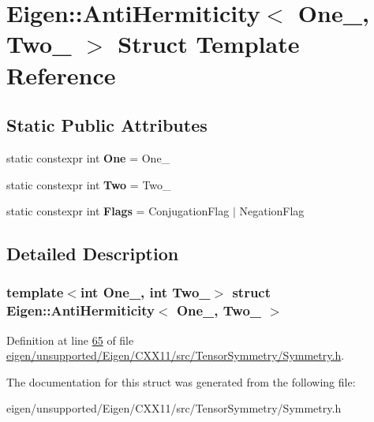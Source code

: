 \hypertarget{struct_eigen_1_1_anti_hermiticity}{}\section{Eigen\+:\+:Anti\+Hermiticity$<$ One\+\_\+, Two\+\_\+ $>$ Struct Template Reference}
\label{struct_eigen_1_1_anti_hermiticity}
\subsection*{Static Public Attributes}
\begin{DoxyCompactItemize}
\item 
\mbox{\label{struct_eigen_1_1_anti_hermiticity_a02cefda3a5d9e5f146e654456975be2e}} 
static constexpr int {\bfseries One} = One\+\_\+
\item 
\mbox{\label{struct_eigen_1_1_anti_hermiticity_a6e7a4449019f8ac44ea698daef1591c3}} 
static constexpr int {\bfseries Two} = Two\+\_\+
\item 
\mbox{\label{struct_eigen_1_1_anti_hermiticity_a720555cf411148c0563d98b205f3b469}} 
static constexpr int {\bfseries Flags} = Conjugation\+Flag $\vert$ Negation\+Flag
\end{DoxyCompactItemize}


\subsection{Detailed Description}
\subsubsection*{template$<$int One\+\_\+, int Two\+\_\+$>$\newline
struct Eigen\+::\+Anti\+Hermiticity$<$ One\+\_\+, Two\+\_\+ $>$}



Definition at line \hyperlink{eigen_2unsupported_2_eigen_2_c_x_x11_2src_2_tensor_symmetry_2_symmetry_8h_source_l00065}{65} of file \hyperlink{eigen_2unsupported_2_eigen_2_c_x_x11_2src_2_tensor_symmetry_2_symmetry_8h_source}{eigen/unsupported/\+Eigen/\+C\+X\+X11/src/\+Tensor\+Symmetry/\+Symmetry.\+h}.



The documentation for this struct was generated from the following file\+:\begin{DoxyCompactItemize}
\item 
eigen/unsupported/\+Eigen/\+C\+X\+X11/src/\+Tensor\+Symmetry/\+Symmetry.\+h\end{DoxyCompactItemize}
